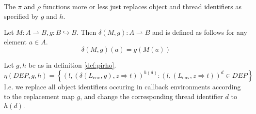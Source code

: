 \begin{note}
  The $\pi$ and $\rho$ functions more or less just replaces object and thread
  identifiers as specified by $g$ and $h$.
\end{note}

\begin{definition}
  Let $M: A \rightharpoonup B, g: B \hookrightarrow B$. Then $\delta(M, g): A
  \rightharpoonup B$ and is defined as follows for any element $a \in A$.
  \begin{equation*}
    \delta(M, g)(a) = g(M(a))
  \end{equation*}
\end{definition}

\begin{definition}
  Let $g, h$ be as in definition \ref{def:pirho}. 
  \begin{equation*}
    \eta(DEP, g, h) = \left\{ (l, (\delta(L_{\text{env}}, g), z \Rightarrow
    t))^{h(d)}: (l,
    (L_{\text{env}}, z \Rightarrow t))^d \in DEP \right\}
  \end{equation*}
  I.e. we replace all object identifiers occuring in callback environments
  according to the replacement map $g$, and change the corresponding thread
  identifier $d$ to $h(d)$.
\end{definition}


